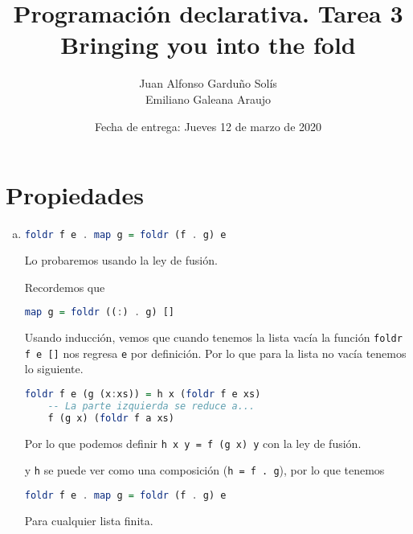 \documentclass[spanish,12pt,letterpaper]{article}
\title{Programación declarativa. Tarea 3\\
  \Huge{Bringing you into the fold}}
\author{Juan Alfonso Garduño Solís\\
  Emiliano Galeana Araujo}
\affil{Facultad de ciencias, UNAM}
\date{Fecha de entrega: Jueves 12 de marzo de 2020}
\begin{document}
\maketitle

\section{Propiedades}
\begin{enumerate}[(a)]
\item
  \begin{lstlisting}[language=Haskell]
    foldr f e . map g = foldr (f . g) e
  \end{lstlisting}
  Lo probaremos usando la ley de fusión.

  Recordemos que
  \begin{lstlisting}[language=Haskell]
    map g = foldr ((:) . g) []
  \end{lstlisting}
  Usando inducción, vemos que cuando tenemos la lista vacía la función
  \texttt{foldr f e []} nos regresa \texttt{e} por definición. Por lo que para la
  lista no vacía tenemos lo siguiente.
  \begin{lstlisting}[language=Haskell]
    foldr f e (g (x:xs)) = h x (foldr f e xs)
    -- La parte izquierda se reduce a...
    f (g x) (foldr f a xs)
  \end{lstlisting}
  Por lo que podemos definir \texttt{h x y = f (g x) y} con la ley de fusión.

  y \texttt{h} se puede ver como una composición (\texttt{h = f . g}), por lo que
  tenemos
  \begin{lstlisting}[language=Haskell]
    foldr f e . map g = foldr (f . g) e
  \end{lstlisting}
  Para cualquier lista finita.


\end{enumerate}
\end{document}
